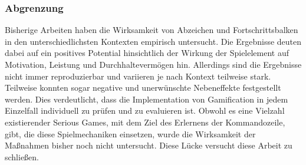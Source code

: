 \subsubsection{Abgrenzung}
Bisherige Arbeiten haben die Wirksamkeit von Abzeichen und Fortschrittsbalken in den unterschiedlichsten Kontexten empirisch untersucht.
Die Ergebnisse deuten dabei auf ein positives Potential hinsichtlich der Wirkung der Spielelement auf Motivation, Leistung und Durchhaltevermögen hin. Allerdings sind die Ergebnisse nicht immer reproduzierbar und variieren je nach Kontext teilweise stark. Teilweise konnten sogar negative und unerwünschte Nebeneffekte festgestellt werden. Dies verdeutlicht, dass die Implementation von Gamification in jedem Einzelfall individuell zu prüfen und zu evaluieren ist.
Obwohl es eine Vielzahl existierender Serious Games, mit dem Ziel des Erlernens der Kommandozeile, gibt, die diese Spielmechaniken einsetzen, wurde die Wirksamkeit der Maßnahmen bisher noch nicht untersucht. Diese Lücke versucht diese Arbeit zu schließen.